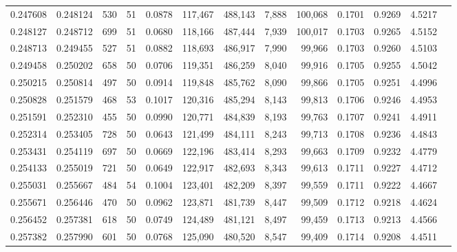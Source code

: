 \begin{tabular}{rrrrrrrrrrrrr}
0.247608 & 0.248124 &   530 &  51 &                                     0.0878 & 117,467 & 488,143 &   7,888 & 100,068 & 0.1701 & 0.9269 & 4.5217 \\
0.248127 & 0.248712 &   699 &  51 &                                     0.0680 & 118,166 & 487,444 &   7,939 & 100,017 & 0.1703 & 0.9265 & 4.5152 \\
0.248713 & 0.249455 &   527 &  51 &                                     0.0882 & 118,693 & 486,917 &   7,990 &  99,966 & 0.1703 & 0.9260 & 4.5103 \\
0.249458 & 0.250202 &   658 &  50 &                                     0.0706 & 119,351 & 486,259 &   8,040 &  99,916 & 0.1705 & 0.9255 & 4.5042 \\
0.250215 & 0.250814 &   497 &  50 &                                     0.0914 & 119,848 & 485,762 &   8,090 &  99,866 & 0.1705 & 0.9251 & 4.4996 \\
0.250828 & 0.251579 &   468 &  53 &                                     0.1017 & 120,316 & 485,294 &   8,143 &  99,813 & 0.1706 & 0.9246 & 4.4953 \\
0.251591 & 0.252310 &   455 &  50 &                                     0.0990 & 120,771 & 484,839 &   8,193 &  99,763 & 0.1707 & 0.9241 & 4.4911 \\
0.252314 & 0.253405 &   728 &  50 &                                     0.0643 & 121,499 & 484,111 &   8,243 &  99,713 & 0.1708 & 0.9236 & 4.4843 \\
0.253431 & 0.254119 &   697 &  50 &                                     0.0669 & 122,196 & 483,414 &   8,293 &  99,663 & 0.1709 & 0.9232 & 4.4779 \\
0.254133 & 0.255019 &   721 &  50 &                                     0.0649 & 122,917 & 482,693 &   8,343 &  99,613 & 0.1711 & 0.9227 & 4.4712 \\
0.255031 & 0.255667 &   484 &  54 &                                     0.1004 & 123,401 & 482,209 &   8,397 &  99,559 & 0.1711 & 0.9222 & 4.4667 \\
0.255671 & 0.256446 &   470 &  50 &                                     0.0962 & 123,871 & 481,739 &   8,447 &  99,509 & 0.1712 & 0.9218 & 4.4624 \\
0.256452 & 0.257381 &   618 &  50 &                                     0.0749 & 124,489 & 481,121 &   8,497 &  99,459 & 0.1713 & 0.9213 & 4.4566 \\
0.257382 & 0.257990 &   601 &  50 &                                     0.0768 & 125,090 & 480,520 &   8,547 &  99,409 & 0.1714 & 0.9208 & 4.4511 \\

\end{tabular}
